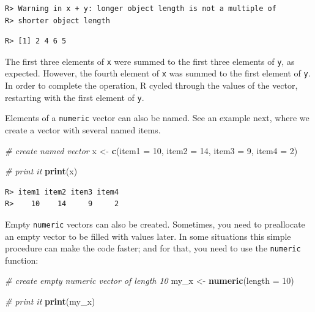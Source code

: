 \documentclass[
  12pt,
]{book}
\newenvironment{Shaded}{\begin{snugshade}}{\end{snugshade}}
\newcommand{\CommentTok}[1]{\textcolor[rgb]{0.37,0.37,0.37}{\textit{#1}}}
\newcommand{\DataTypeTok}[1]{\textcolor[rgb]{0.27,0.27,0.27}{#1}}
\newcommand{\DecValTok}[1]{\textcolor[rgb]{0.06,0.06,0.06}{#1}}
\newcommand{\KeywordTok}[1]{\textcolor[rgb]{0.27,0.27,0.27}{\textbf{#1}}}
\newcommand{\NormalTok}[1]{#1}
\newcommand{\StringTok}[1]{\textcolor[rgb]{0.5,0.5,0.5}{#1}}
\begin{document}
\begin{verbatim}
R> Warning in x + y: longer object length is not a multiple of
R> shorter object length
\end{verbatim}

\begin{verbatim}
R> [1] 2 4 6 5
\end{verbatim}

The first three elements of \texttt{x} were summed to the first three elements of \texttt{y}, as expected. However, the fourth element of \texttt{x} was summed to the first element of \texttt{y}. In order to complete the operation, R cycled through the values of the vector, restarting with the first element of \texttt{y}.

Elements of a \texttt{numeric} vector can also be named. See an example next, where we create a vector with several named items.

\begin{Shaded}
\begin{Highlighting}[]
\CommentTok{# create named vector}
\NormalTok{x <-}\StringTok{ }\KeywordTok{c}\NormalTok{(}\DataTypeTok{item1 =} \DecValTok{10}\NormalTok{, }
       \DataTypeTok{item2 =} \DecValTok{14}\NormalTok{, }
       \DataTypeTok{item3 =} \DecValTok{9}\NormalTok{, }
       \DataTypeTok{item4 =} \DecValTok{2}\NormalTok{)}

\CommentTok{# print it}
\KeywordTok{print}\NormalTok{(x)}
\end{Highlighting}
\end{Shaded}

\begin{verbatim}
R> item1 item2 item3 item4 
R>    10    14     9     2
\end{verbatim}

Empty \texttt{numeric} vectors can also be created. Sometimes, you need to preallocate an empty vector to be filled with values later. In some situations this simple procedure can make the code faster; and for that, you need to use the \texttt{numeric} function: 

\begin{Shaded}
\begin{Highlighting}[]
\CommentTok{# create empty numeric vector of length 10}
\NormalTok{my_x <-}\StringTok{ }\KeywordTok{numeric}\NormalTok{(}\DataTypeTok{length =} \DecValTok{10}\NormalTok{)}

\CommentTok{# print it}
\KeywordTok{print}\NormalTok{(my_x)}
\end{Highlighting}
\end{Shaded}
\end{document}
